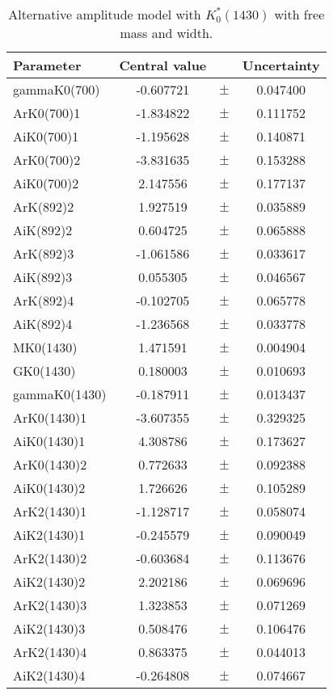 \clearpage

\begin{table}
\centering
\caption{Alternative amplitude model with $K^*_0(1430)$ with free mass and width.}
\begin{tiny}
\begin{tabular}{lccc}
\toprule
Parameter & Central value & & Uncertainty\\
\midrule 
gammaK0(700) & -0.607721 & $\pm$ & 0.047400 \\
ArK0(700)1 & -1.834822 & $\pm$ & 0.111752 \\
AiK0(700)1 & -1.195628 & $\pm$ & 0.140871 \\
ArK0(700)2 & -3.831635 & $\pm$ & 0.153288 \\
AiK0(700)2 & 2.147556 & $\pm$ & 0.177137 \\
ArK(892)2 & 1.927519 & $\pm$ & 0.035889 \\
AiK(892)2 & 0.604725 & $\pm$ & 0.065888 \\
ArK(892)3 & -1.061586 & $\pm$ & 0.033617 \\
AiK(892)3 & 0.055305 & $\pm$ & 0.046567 \\
ArK(892)4 & -0.102705 & $\pm$ & 0.065778 \\
AiK(892)4 & -1.236568 & $\pm$ & 0.033778 \\
MK0(1430) & 1.471591 & $\pm$ & 0.004904 \\
GK0(1430) & 0.180003 & $\pm$ & 0.010693 \\
gammaK0(1430) & -0.187911 & $\pm$ & 0.013437 \\
ArK0(1430)1 & -3.607355 & $\pm$ & 0.329325 \\
AiK0(1430)1 & 4.308786 & $\pm$ & 0.173627 \\
ArK0(1430)2 & 0.772633 & $\pm$ & 0.092388 \\
AiK0(1430)2 & 1.726626 & $\pm$ & 0.105289 \\
ArK2(1430)1 & -1.128717 & $\pm$ & 0.058074 \\
AiK2(1430)1 & -0.245579 & $\pm$ & 0.090049 \\
ArK2(1430)2 & -0.603684 & $\pm$ & 0.113676 \\
AiK2(1430)2 & 2.202186 & $\pm$ & 0.069696 \\
ArK2(1430)3 & 1.323853 & $\pm$ & 0.071269 \\
AiK2(1430)3 & 0.508476 & $\pm$ & 0.106476 \\
ArK2(1430)4 & 0.863375 & $\pm$ & 0.044013 \\
AiK2(1430)4 & -0.264808 & $\pm$ & 0.074667 \\

\end{tabular}
\end{tiny}
\end{table}
